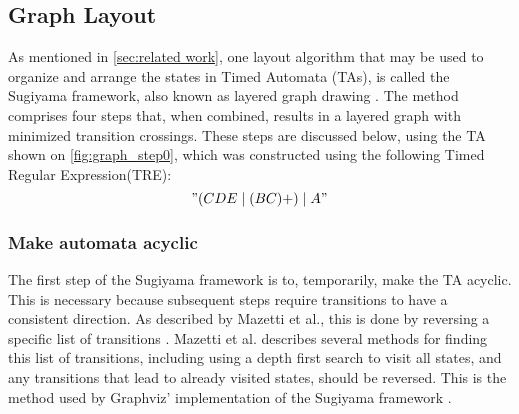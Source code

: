 \subsection{Graph Layout}\label{subsec:graphlayout}





As mentioned in \cref{sec:related work}, one layout algorithm that may be used to organize and arrange the states in Timed Automata (TAs), is called the Sugiyama framework, also known as layered graph drawing \cite{Sugiyama1981}. The method comprises four steps that, when combined, results in a layered graph with minimized transition crossings. These steps are discussed below, using the TA shown on \cref{fig:graph_step0}, which was constructed using the following Timed Regular Expression(TRE): $$"(CDE\mid(BC)+)\mid A"$$

\begin{center}
    
\end{center}

\subsubsection{Make automata acyclic}
The first step of the Sugiyama framework is to, temporarily, make the TA acyclic. This is necessary because subsequent steps require transitions to have a consistent direction. As described by Mazetti et al., this is done by reversing a specific list of transitions \cite{Mazetti2012}.
Mazetti et al. describes several methods for finding this list of transitions, including using a depth first search to visit all states, and any transitions that lead to already visited states, should be reversed.
This is the method used by Graphviz' implementation of the Sugiyama framework \cite{Graphviz}. %

